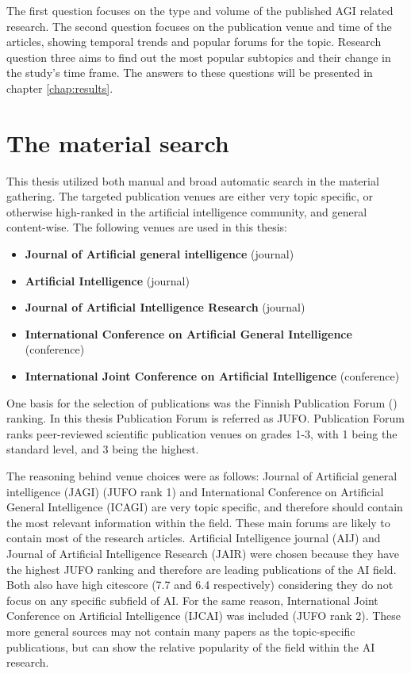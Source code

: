 \documentclass[utf8,english]{gradu3}
\begin{document}
The first question focuses on the type and volume of the published AGI related
research. The second question focuses on the publication venue and time of the
articles, showing temporal trends and popular forums for the topic. Research
question three aims to find out the most popular subtopics and their change in
the study's time frame. The answers to these questions will be presented in
chapter \ref*{chap:results}.


\section{The material search}

This thesis utilized both manual and broad automatic search in the material
gathering. The targeted publication venues are either very topic specific, or
otherwise high-ranked in the artificial intelligence community, and general
content-wise. The following venues are used in this thesis:

\begin{itemize}
  \item \textbf{Journal of Artificial general intelligence} (journal)
  \item \textbf{Artificial Intelligence} (journal)
  \item \textbf{Journal of Artificial Intelligence Research} (journal)
  \item \textbf{International Conference on Artificial General Intelligence}
        (conference)
  \item \textbf{International Joint Conference on Artificial Intelligence}
        (conference)
\end{itemize}

One basis for the selection of publications was the Finnish Publication Forum
(\cite{jufo}) ranking. In this thesis Publication Forum is referred as JUFO.
Publication Forum ranks peer-reviewed scientific publication venues on grades
1-3, with 1 being the standard level, and 3 being the highest.

The reasoning behind venue choices were as follows: Journal of Artificial
general intelligence (JAGI) (JUFO rank 1) and International Conference on
Artificial General Intelligence (ICAGI) are very topic specific, and therefore
should contain the most relevant information within the field. These main forums
are likely to contain most of the research articles. Artificial Intelligence
journal (AIJ) and Journal of Artificial Intelligence Research (JAIR) were chosen
because they have the highest JUFO ranking and therefore are leading
publications of the AI field. Both also have high citescore (7.7 and 6.4
respectively) considering they do not focus on any specific subfield of AI. For
the same reason, International Joint Conference on Artificial Intelligence
(IJCAI) was included (JUFO rank 2). These more general sources may not contain
many papers as the topic-specific publications, but can show the relative
popularity of the field within the AI research.
\end{document}
